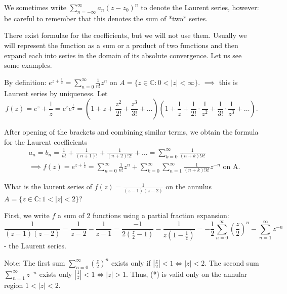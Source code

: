 \begin{remark}
    We sometimes write $\sum_{n=-\infty}^{\infty} a_n (z - z_0)^n$ to denote the Laurent series, however: be careful to remember that this denotes the sum of *two* series.
\end{remark}

There exist formulae for the coefficients, but we will not use
them. Usually we will represent the function as a sum or a product of two functions and then expand each into series in the domain of its absolute convergence. Let us see some examples.

\begin{example}\label{example:15.9} By definition: $e^{z + \frac{1}{z}} = \sum_{n=0}^{\infty} \frac{1}{n!} z^n$ on $A = \{z \in \mathbb{C}: 0 < |z| < \infty\}$.
$\implies$ this is Laurent series by uniqueness. Let 
\[ f(z) = e^z + \frac{1}{z} = e^z e^{\frac{1}{z}} = \left(1 + z + \frac{z^2}{2!} + \frac{z^3}{3!} + \dots \right)\left(1 + \frac{1}{z} + \frac{1}{2!} \cdot \frac{1}{z^2} + \frac{1}{3!} \cdot \frac{1}{z^3} + \dots \right).\]

After opening of the brackets and combining similar terms, we obtain the formula for the Laurent coefficients
\begin{align*}
    & a_n = b_n = \frac{1}{n!} + \frac{1}{(n+1)!} + \frac{1}{(n+2)!2!} + \dots = \sum_{k=0}^{\infty} \frac{1}{(n+k)!k!} \\
    & \implies f(z) = e^{z + \frac{1}{z}} = \sum_{n=0}^{\infty} \frac{1}{n!} z^n + \sum_{k=0}^{\infty} \sum_{n=1}^{\infty} \frac{1}{(n+k)!k!} z^{-n} \text{ on A.} 
\end{align*}
\end{example}

\begin{example}\label{example:15.10} What is the laurent series of $f(z) = \frac{1}{(z-1)(z-2)}$ on the annulus $A = \{z \in \mathbb{C}: 1 < |z| < 2\}$?

First, we write $f$ a sum of 2 functions using a partial fraction expansion:
\[
 \frac{1}{(z-1)(z-2)} = \frac{1}{z-2} - \frac{1}{z-1} = \frac{-1}{2(\frac{z}{2} - 1)} - \frac{1}{z(1-\frac{1}{z})} = -\frac{1}{2} \sum_{n=0}^{\infty} \left(\frac{z}{2}\right)^n - \sum_{n=1}^{\infty} z^{-n} 
\]
- the Laurent series.
\end{example}

Note: The first sum $\sum_{n=0}^{\infty} \left(\frac{z}{2}\right)^n$ exists only if $|\frac{z}{2}| < 1 \iff |z| < 2$. The second sum $\sum_{n=1}^{\infty} z^{-n}$ exists only $|\frac{1}{z}| < 1 \iff |z| > 1$. Thus, (*) is valid only on the annular region $1 < |z| < 2$.

